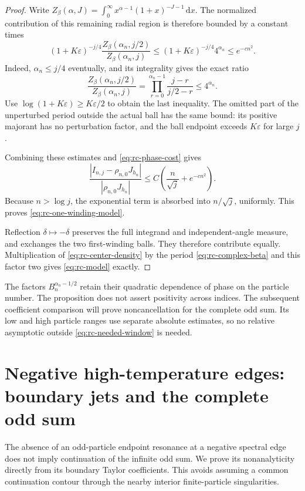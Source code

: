 \documentclass[11pt]{article}
\numberwithin{equation}{section}
\theoremstyle{definition}
\newcommand{\dd}{\,\mathrm d}
\begin{document}
\begin{proof}
Write
$Z_\beta(\alpha,J)=\int_0^\infty
x^{\alpha-1}(1+x)^{-J-1}\dd x$.
The normalized contribution of this remaining radial region is
therefore bounded by a constant times
\begin{equation}\label{eq:rc-radial-tail}
 (1+K\varepsilon)^{-j/4}
 \frac{Z_\beta(\alpha_n,j/2)}{Z_\beta(\alpha_n,j)}
 \le (1+K\varepsilon)^{-j/4}4^{\alpha_n}
 \le e^{-cn^2}.
\end{equation}
Indeed, $\alpha_n\le j/4$ eventually, and its integrality gives
the exact ratio
\[
 \frac{Z_\beta(\alpha_n,j/2)}{Z_\beta(\alpha_n,j)}
 =\prod_{r=0}^{\alpha_n-1}\frac{j-r}{j/2-r}\le4^{\alpha_n}.
\]
Use $\log(1+K\varepsilon)\ge K\varepsilon/2$ to obtain the
last inequality.  The omitted part of the unperturbed period
outside the actual ball has the same bound: its positive majorant
has no perturbation factor, and the ball endpoint exceeds
$K\varepsilon$ for large $j$.

Combining these estimates and \eqref{eq:rc-phase-cost} gives
\[
 \frac{|I_{n,j}-\rho_{n,0}J_{h_n}|}
 { |\rho_{n,0}J_{h_n}|}
 \le C\left(\frac n{\sqrt j}+e^{-cn^2}\right).
\]
Because $n>\log j$, the exponential term is absorbed into
$n/\sqrt j$, uniformly.  This proves
\eqref{eq:rc-one-winding-model}.

Reflection $\delta\mapsto-\delta$ preserves the full integrand
and independent-angle measure, and exchanges the two first-winding
balls.  They therefore contribute equally.  Multiplication of
\eqref{eq:rc-center-density} by the period
\eqref{eq:rc-complex-beta} and this factor two gives
\eqref{eq:rc-model} exactly.
\end{proof}

The factors $B_n^{\alpha_n-1/2}$ retain their quadratic dependence
of phase on the particle number.  The proposition does not assert
positivity across indices.  The subsequent coefficient comparison
will prove noncancellation for the complete odd sum.  Its low and
high particle ranges use separate absolute estimates, so no relative
asymptotic outside \eqref{eq:rc-needed-window} is needed.

\section{Negative high-temperature edges: boundary jets and the complete odd sum}
\label{sec:jets}

The absence of an odd-particle endpoint resonance at a negative spectral
edge does not imply continuation of the infinite odd sum. We prove its
nonanalyticity directly from its boundary Taylor coefficients. This avoids
assuming a common continuation contour through the nearby interior
finite-particle singularities.
\end{document}
